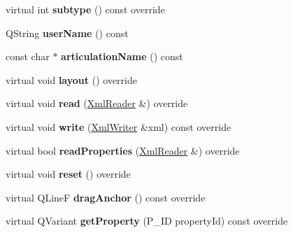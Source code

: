 \begin{DoxyCompactItemize}
virtual int {\bfseries subtype} () const override
\item 
\mbox{\label{class_ms_1_1_articulation_ac1bea6ccc5897c1bc50b288befd04a85}} 
Q\+String {\bfseries user\+Name} () const
\item 
\mbox{\label{class_ms_1_1_articulation_a4d859a61c6b5e5167dc70390633c3632}} 
const char $\ast$ {\bfseries articulation\+Name} () const
\item 
\mbox{\label{class_ms_1_1_articulation_a3ab3103c03cb1f2e00f4d9db523df2fc}} 
virtual void {\bfseries layout} () override
\item 
\mbox{\label{class_ms_1_1_articulation_a4d512ce2ff35ee10fe928a6f419f4abe}} 
virtual void {\bfseries read} (\hyperlink{class_ms_1_1_xml_reader}{Xml\+Reader} \&) override
\item 
\mbox{\label{class_ms_1_1_articulation_a632d2979eb953690294f63c8506b78f8}} 
virtual void {\bfseries write} (\hyperlink{class_ms_1_1_xml_writer}{Xml\+Writer} \&xml) const override
\item 
\mbox{\label{class_ms_1_1_articulation_a285abcccd27fa7e0ad0ecc4a0623ba8f}} 
virtual bool {\bfseries read\+Properties} (\hyperlink{class_ms_1_1_xml_reader}{Xml\+Reader} \&) override
\item 
\mbox{\label{class_ms_1_1_articulation_a1751efa217e7152dea73c482ce651ce2}} 
virtual void {\bfseries reset} () override
\item 
\mbox{\label{class_ms_1_1_articulation_ac7b5ff335439986c05efc944119613f1}} 
virtual Q\+LineF {\bfseries drag\+Anchor} () const override
\item 
\mbox{\label{class_ms_1_1_articulation_a740cc7b3d88cce5840158886bf45d55f}} 
virtual Q\+Variant {\bfseries get\+Property} (P\+\_\+\+ID property\+Id) const override
\item 
\mbox{\label{class_ms_1_1_articulation_a25d6cdcbac6c3a3e07e5f06d70ce32f1}} 

\end{DoxyCompactItemize}
